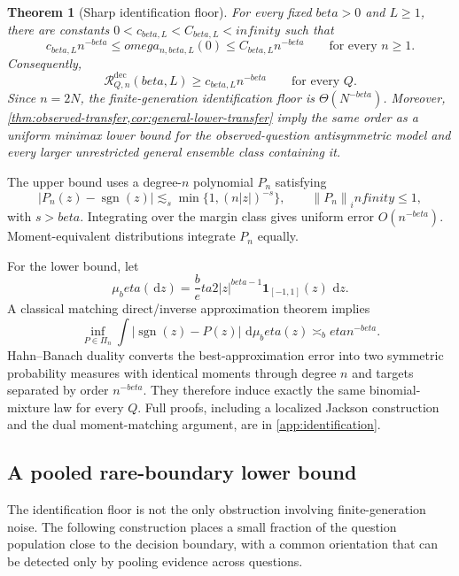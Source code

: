 \documentclass[11pt]{article}
\def\beta{beta}%
\def\omega{omega}%
\def\infty{infinity}%
\newtheorem{theorem}{Theorem}[section]
\newcommand{\one}{\mathbf 1}
\newcommand{\sgn}{\operatorname{sgn}}
\newcommand{\calR}{\mathcal R}
\newcommand{\norm}[1]{\left\lVert#1\right\rVert}
\newcommand{\dd}{\,\mathrm d}
\begin{document}
\begin{theorem}[Sharp identification floor]
\label{thm:identification-floor}
For every fixed $\beta>0$ and $L\ge1$, there are constants $0<c_{\beta,L}<C_{\beta,L}<\infty$ such that
\begin{equation}
\label{eq:identification-floor}
 c_{\beta,L}n^{-\beta}
\le
\omega_{n,\beta,L}(0)
\le
C_{\beta,L}n^{-\beta}
\qquad\text{for every }n\ge1.
\end{equation}
Consequently,
\begin{equation}
\label{eq:N-only-lower}
\calR^{\mathrm{dec}}_{Q,n}(\beta,L)
\ge c_{\beta,L}n^{-\beta}
\qquad\text{for every }Q.
\end{equation}
Since $n=2N$, the finite-generation identification floor is $\Theta(N^{-\beta})$.
Moreover, \cref{thm:observed-transfer,cor:general-lower-transfer} imply the same order as a uniform minimax lower bound for the observed-question antisymmetric model and every larger unrestricted general ensemble class containing it.
\end{theorem}

The upper bound uses a degree-$n$ polynomial $P_n$ satisfying
\[
|P_n(z)-\sgn(z)|
\lesssim_s
\min\{1,(n|z|)^{-s}\},
\qquad \norm{P_n}_\infty\le1,
\]
with $s>\beta$.  Integrating over the margin class gives uniform error $O(n^{-\beta})$.  Moment-equivalent distributions integrate $P_n$ equally.

For the lower bound, let
\[
\mu_\beta(\dd z)
=
\frac\beta2|z|^{\beta-1}\one_{[-1,1]}(z)\,\dd z.
\]
A classical matching direct/inverse approximation theorem implies
\begin{equation}
\label{eq:weighted-L1}
\inf_{P\in\Pi_n}
\int|\sgn(z)-P(z)|\,\dd\mu_\beta(z)
\asymp_\beta n^{-\beta}.
\end{equation}
Hahn--Banach duality converts the best-approximation error into two symmetric probability measures with identical moments through degree $n$ and targets separated by order $n^{-\beta}$.  They therefore induce exactly the same binomial-mixture law for every $Q$.  Full proofs, including a localized Jackson construction and the dual moment-matching argument, are in \cref{app:identification}.

\subsection{A pooled rare-boundary lower bound}

The identification floor is not the only obstruction involving finite-generation noise.  The following construction places a small fraction of the question population close to the decision boundary, with a common orientation that can be detected only by pooling evidence across questions.
\end{document}
